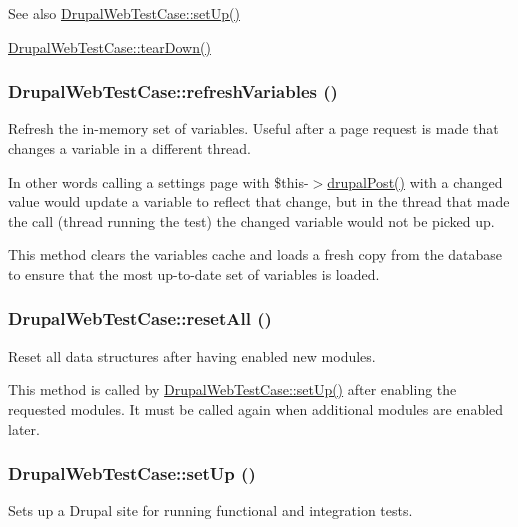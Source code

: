 \begin{DoxySeeAlso}{See also}
\hyperlink{classDrupalWebTestCase_a110ecf5deb57ee6a908617360c1f6ec4}{DrupalWebTestCase::setUp()} 

\hyperlink{classDrupalWebTestCase_a6c0dba3c89c4aab3fa2576857c6f2be1}{DrupalWebTestCase::tearDown()} 
\end{DoxySeeAlso}
\hypertarget{classDrupalWebTestCase_ad82b8c5cdc60fb19c9550ab7ba3fd017}{
\subsubsection[{refreshVariables}]{\setlength{\rightskip}{0pt plus 5cm}DrupalWebTestCase::refreshVariables ()}}
\label{classDrupalWebTestCase_ad82b8c5cdc60fb19c9550ab7ba3fd017}
Refresh the in-\/memory set of variables. Useful after a page request is made that changes a variable in a different thread.

In other words calling a settings page with \$this-\/$>$\hyperlink{classDrupalWebTestCase_acbc229f81258bb985a1f011a4a5a99a3}{drupalPost()} with a changed value would update a variable to reflect that change, but in the thread that made the call (thread running the test) the changed variable would not be picked up.

This method clears the variables cache and loads a fresh copy from the database to ensure that the most up-\/to-\/date set of variables is loaded. \hypertarget{classDrupalWebTestCase_a2e4892b3ad344e16afa73847432190fa}{
\subsubsection[{resetAll}]{\setlength{\rightskip}{0pt plus 5cm}DrupalWebTestCase::resetAll ()}}
\label{classDrupalWebTestCase_a2e4892b3ad344e16afa73847432190fa}
Reset all data structures after having enabled new modules.

This method is called by \hyperlink{classDrupalWebTestCase_a110ecf5deb57ee6a908617360c1f6ec4}{DrupalWebTestCase::setUp()} after enabling the requested modules. It must be called again when additional modules are enabled later. \hypertarget{classDrupalWebTestCase_a110ecf5deb57ee6a908617360c1f6ec4}{
\subsubsection[{setUp}]{\setlength{\rightskip}{0pt plus 5cm}DrupalWebTestCase::setUp ()}}
\label{classDrupalWebTestCase_a110ecf5deb57ee6a908617360c1f6ec4}
Sets up a Drupal site for running functional and integration tests.

